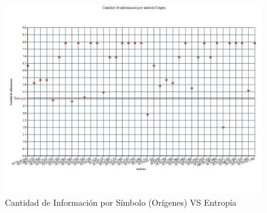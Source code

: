 \begin{figure}[H]
  \centering
    \includegraphics[scale=0.45]{imagenes/graficos/entropiaCantInf/04origen.jpg}
  \caption{Cantidad de Información por Símbolo (Orígenes) VS Entropía}
  \label{fig:ejemplo}
\end{figure}

